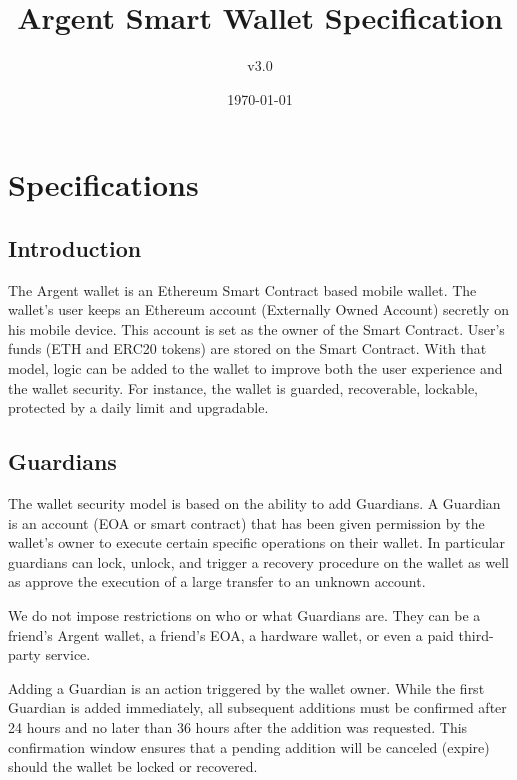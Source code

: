 \documentclass[12pt]{article}
\title{Argent Smart Wallet Specification}
\author{v3.0}
\date{\today}
\begin{document}
\maketitle

\section{Specifications}

\subsection{Introduction}

The Argent wallet is an Ethereum Smart Contract based mobile wallet. The wallet's user keeps an Ethereum account (Externally Owned Account) secretly on his mobile device. This account is set as the owner of the Smart Contract. User's funds (ETH and ERC20 tokens) are stored on the Smart Contract. With that model, logic can be added to the wallet to improve both the user experience and the wallet security. For instance, the wallet is guarded, recoverable, lockable, protected by a daily limit and upgradable.

\subsection{Guardians}

The wallet security model is based on the ability to add Guardians. A Guardian is an account (EOA or smart contract) that has been given permission by the wallet's owner to execute certain specific operations on their wallet. In particular guardians can lock, unlock, and trigger a recovery procedure on the wallet as well as approve the execution of a large transfer to an unknown account.

We do not impose restrictions on who or what Guardians are. They can be a friend's Argent wallet, a friend's EOA, a hardware wallet, or even a paid third-party service.

Adding a Guardian is an action triggered by the wallet owner. While the first Guardian is added immediately, all subsequent additions must be confirmed after 24 hours and no later than 36 hours after the addition was requested. This confirmation window ensures that a pending addition will be canceled (expire) should the wallet be locked or recovered.
\end{document}
